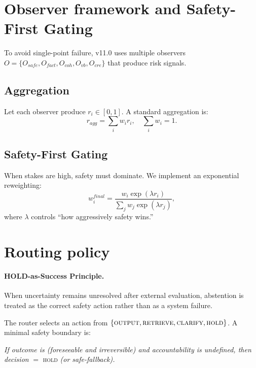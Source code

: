 \documentclass[11pt,a4paper]{article}
\begin{document}
\section{Observer framework and Safety-First Gating}

To avoid single-point failure, v11.0 uses multiple observers
$O = \{O_{safe}, O_{fact}, O_{coh}, O_{vb}, O_{cre}\}$ that produce risk signals.

\subsection{Aggregation}
Let each observer produce $r_i \in [0,1]$. A standard aggregation is:
\begin{equation}
r_{agg} = \sum_i w_i r_i, \quad \sum_i w_i = 1.
\end{equation}

\subsection{Safety-First Gating}
When stakes are high, safety must dominate. We implement an exponential reweighting:
\begin{equation}
w_i^{final} = \frac{w_i \exp(\lambda r_i)}{\sum_j w_j \exp(\lambda r_j)},
\end{equation}
where $\lambda$ controls ``how aggressively safety wins.''

\section{Routing policy}

\paragraph{HOLD-as-Success Principle.}
When uncertainty remains unresolved after external evaluation, abstention is treated as the
correct safety action rather than as a system failure.

The router selects an action from
$\{\textsc{output}, \textsc{retrieve}, \textsc{clarify}, \textsc{hold}\}$.
A minimal safety boundary is:

\textit{If outcome is (foreseeable and irreversible) and accountability is undefined, then
decision} $=$ \textsc{hold} \textit{(or safe-fallback).}
\end{document}
